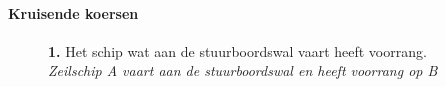 \paragraph{Kruisende koersen}
\vspace{-0.7cm}
\begin{figure}[H]
	\centering
	\begin{minipage}[t]{0.70\textwidth}
		\textbf{1.} Het schip wat aan de stuurboordswal vaart heeft voorrang.\\
		\textit{Zeilschip A vaart aan de stuurboordswal en heeft voorrang op B}
	\end{minipage}
	\hfill
	\begin{minipage}[t]{0.20\textwidth}
		\label{pic:kr1}
	\end{minipage}
	\hfill
\end{figure}

\vspace{-0.7cm}

